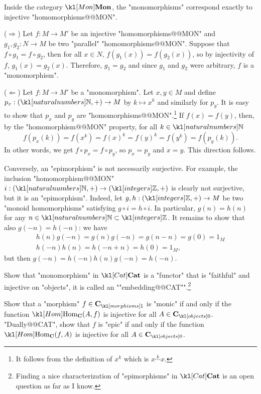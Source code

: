 \documentclass[main.tex]{subfiles}
\begin{document}
\begin{exmp}[$\catMon$]\label{exmp:monepiMON}
Inside the category $\catMon$, the "monomorphisms" correspond exactly to injective "homomorphisms@@MON".

($\Rightarrow$) Let $f:M\rightarrow M'$ be an injective "homomorphisms@@MON" and $g_1,g_2:N\rightarrow M$ be two "parallel" "homomorphisms@@MON". Suppose that $f\circ g_1 = f\circ g_2$, then for all $x \in N$, $f(g_1(x)) = f(g_2(x))$, so by injectivity of $f$, $g_1(x) = g_2(x)$. Therefore, $g_1 = g_2$ and since $g_1$ and $g_2$ were arbitrary, $f$ is a "monomorphism".

($\Leftarrow$) Let $f:M\rightarrow M'$ be a "monomorphism". Let $x,y \in M$ and define $p_x :(\N,+) \rightarrow M$ by $k\mapsto x^k$ and similarly for $p_y$. It is easy to show that $p_x$ and $p_y$ are "homomorphisms@@MON".\footnote{It follows from the definition of $x^k$ which is $x\stackrel{k}{\cdots}x$.} If $f(x) = f(y)$, then, by the "homomorphism@@MON" property, for all $k \in \N$
\[f(p_x(k))= f(x^k) = f(x)^k  = f(y)^k = f(y^k) = f(p_y(k)).\]
In other words, we get $f\circ p_x = f \circ p_y$, so $p_x = p_y$ and $x = y$. This direction follows.

Conversely, an "epimorphism" is not necessarily surjective. For example, the inclusion "homomorphism@@MON" $i:(\N,+) \rightarrow (\Z,+)$ is clearly not surjective, but it is an "epimorphism". Indeed, let $g,h: (\Z,+)\rightarrow M$ be two "monoid homomorphisms" satisfying $g \circ i = h\circ i$. In particular, $g(n) = h(n)$ for any $n \in \N\subset \Z$. It remains to show that also $g(-n) = h(-n)$: we have
\begin{gather*}
	h(n)g(-n) = g(n)g(-n) = g(n-n) = g(0) = 1_M\\
	h(-n)h(n) = h(-n+n) = h(0) = 1_M,
\end{gather*} but then $g(-n) = h(-n)h(n)g(-n) = h(-n)$.
\end{exmp}
\begin{exer}\label{exer:duality:monicCat}
	Show that "monomorphism" in $\catCat$ is a "functor" that is "faithful" and injective on "objects", it is called an ""embedding@@CAT"".\footnote{Finding a nice characterization of "epimorphisms" in $\catCat$ is an open question as far as I know.}
\end{exer}
\begin{exer}\label{exer:duality:altdefmonepi}
	Show that a "morphism" $f\in \mor{\mathbf{C}}$ is "monic" if and only if the function $\Hom_{\mathbf{C}}(A,f)$ is injective for all $A \in \obj{\mathbf{C}}$. "Dually@@CAT", show that $f$ is "epic" if and only if the function $\Hom_{\mathbf{C}}(f,A)$ is injective for all $A \in \obj{\mathbf{C}}$.
\end{exer}
\end{document}
